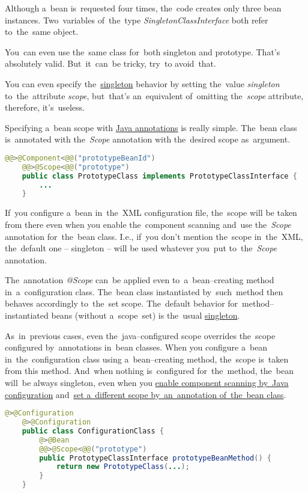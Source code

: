 \noindent Although a~bean is~requested four times, the~code creates only three bean instances.
Two~variables of~the~type \textit{SingletonClassInterface} both refer to~the~same object.

\note You~can even use the~same class for~both singleton and prototype.
That's absolutely valid.
But~it~can~be tricky, try~to avoid~that.

\note You can even specify the~\hyperref[singletondp]{singleton} behavior by setting the~value \textit{singleton} to~the~attribute \textit{scope}, but~that's an~equivalent of~omitting the~\textit{scope} attribute, therefore, it's~useless.

\label{bsannotations}
Specifying a~bean scope with \hyperref[javaannotation]{Java annotations} is really simple.
The~bean class is~annotated with the~\textit{Scope} annotation with the~desired scope as~argument.

\example
\begin{lstlisting}[language=Java, title={Bean class with the prototype scope set by the annotation}]@@>@Component<@@("prototypeBeanId")
    @@>@Scope<@@("prototype")
    public class PrototypeClass implements PrototypeClassInterface {
        ...
    }
\end{lstlisting}

\warning If~you configure a~bean in~the~XML configuration file, the~scope will be taken from there even when you enable the~component scanning and~use the~\textit{Scope} annotation for~the~bean class.
I.e., if~you don't mention the~scope in~the~XML, the~default one -- singleton -- will be used whatever you~put to~the~\textit{Scope} annotation.

The~annotation \textit{@Scope} can~be applied even to~a~bean--creating method in~a~configuration class.
The~bean class instantiated by~such~method then behaves accordingly to~the~set scope.
The~default behavior for~method--instantiated beans (without a~scope~set) is the~usual \hyperref[singletondp]{singleton}.

\warning As~in~previous cases, even the~java--configured scope overrides the~scope configured by~annotations in~bean classes.
When you configure a~bean in~the~configuration class using a~bean--creating method, the~scope is~taken from this method.
And~when nothing is~configured for~the~method, the~bean will~be always singleton, even when you \hyperref[iocnoxml]{enable component scanning by~Java configuration} and~\hyperref[bsannotations]{set a~different scope by~an~annotation of~the~bean class}.

\emten
\example
\begin{lstlisting}[language=Java, title={Configuration class with a prototype bean--creating metod}]@>@Configuration
    @>@Configuration
    public class ConfigurationClass {
        @>@Bean
        @@>@Scope<@@("prototype")
        public PrototypeClassInterface prototypeBeanMethod() {
            return new PrototypeClass(...);
        }
    }
\end{lstlisting}
\newpage
